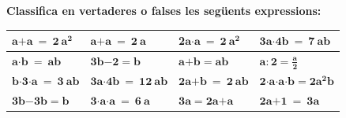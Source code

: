 \begin{iniaval}  
\textbf{Classifica en vertaderes o falses les següents expressions:}

\begin{center}
	
\def\arraystretch{4}
\begin{longtable}{|p{1.1in}|p{1.1in}|p{1.1in}|p{1.1in}|} \hline 
\cellcolor{red!50}$\boldsymbol{a}\boldsymbol{+}\boldsymbol{a}\boldsymbol{\ =\ }\boldsymbol{2}\boldsymbol{\ }{\boldsymbol{a}}^{\boldsymbol{2}}$  & 
\cellcolor{green!50}$\boldsymbol{a}\boldsymbol{+}\boldsymbol{a}\boldsymbol{\ =\ }\boldsymbol{2}\boldsymbol{\ }\boldsymbol{a}$  & \textbf{2}$\boldsymbol{a}\boldsymbol{\textrm{·}}\boldsymbol{a}\boldsymbol{\ =\ }\boldsymbol{2}\boldsymbol{\ }{\boldsymbol{a}}^{\boldsymbol{2}}$  & $\boldsymbol{3}\boldsymbol{a}\boldsymbol{\textrm{·}}\boldsymbol{4}\boldsymbol{b}\boldsymbol{\ =\ }\boldsymbol{7}\boldsymbol{\ }\boldsymbol{ab}$  \\ \hline 
$\boldsymbol{a}\boldsymbol{\textrm{·}}\boldsymbol{b}\boldsymbol{\ =\ }\boldsymbol{ab}$  & $\boldsymbol{3}\boldsymbol{b}\boldsymbol{-}\boldsymbol{2}\boldsymbol{=}\boldsymbol{b}$  & $\boldsymbol{a}\boldsymbol{+}\boldsymbol{b}\boldsymbol{=}\boldsymbol{ab}$  & $\boldsymbol{a}\boldsymbol{:}\boldsymbol{2}\boldsymbol{=}\frac{\boldsymbol{a}}{\boldsymbol{2}}$  \\ \hline 
$\boldsymbol{b}\boldsymbol{\textrm{·}}\boldsymbol{3}\boldsymbol{\textrm{·}}\boldsymbol{a}\boldsymbol{\ =\ }\boldsymbol{3}\boldsymbol{\ }\boldsymbol{ab}$  & $\boldsymbol{3}\boldsymbol{a}\boldsymbol{\textrm{·}}\boldsymbol{4}\boldsymbol{b}\boldsymbol{\ =\ }\boldsymbol{12}\boldsymbol{\ }\boldsymbol{ab}$  & $\boldsymbol{2}\boldsymbol{a}\boldsymbol{+}\boldsymbol{b}\boldsymbol{\ =\ }\boldsymbol{2}\boldsymbol{\ }\boldsymbol{ab}$  & $\boldsymbol{2}\boldsymbol{\textrm{·}}\boldsymbol{a}\boldsymbol{\textrm{·}}\boldsymbol{a}\boldsymbol{\textrm{·}}\boldsymbol{b}\boldsymbol{=}\boldsymbol{2}{\boldsymbol{a}}^{\boldsymbol{2}}\boldsymbol{b}$  \\ \hline 
$\boldsymbol{3}\boldsymbol{b}\boldsymbol{-}\boldsymbol{3}\boldsymbol{b}\boldsymbol{=}\boldsymbol{b}$  & $\boldsymbol{3}\boldsymbol{\textrm{·}}\boldsymbol{a}\boldsymbol{\textrm{·}}\boldsymbol{a}\boldsymbol{\ =\ }\boldsymbol{6}\boldsymbol{\ }\boldsymbol{a}$  & $\boldsymbol{3}\boldsymbol{a}\boldsymbol{=}\boldsymbol{2}\boldsymbol{a}\boldsymbol{+}\boldsymbol{a}$  & $\boldsymbol{2}\boldsymbol{a}\boldsymbol{+}\boldsymbol{1}\boldsymbol{\ =\ }\boldsymbol{3}\boldsymbol{a}$  \\ \hline 
\end{longtable}


\end{center}
\end{iniaval}
